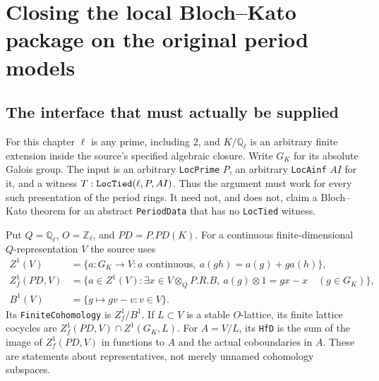 \section{Closing the local Bloch--Kato package on the original period models}
\label{sec:bloch-kato-installation}


\subsection{The interface that must actually be supplied}

For this chapter $\ell$ is any prime, including $2$, and
$K/\mathbb Q_\ell$ is an arbitrary finite extension inside the source's
specified algebraic closure.  Write $G_K$ for its absolute Galois group.
The input is an arbitrary \texttt{Loc\allowbreak Prime} $P$, an arbitrary
\texttt{Loc\allowbreak Ainf} $AI$ for it, and a witness
$T:\texttt{Loc\allowbreak Tied}(\ell,P,AI)$.  Thus the argument must work for every
such presentation of the period rings.  It need not, and does not,
claim a Bloch--Kato theorem for an abstract \texttt{Period\allowbreak Data} that has
no \texttt{Loc\allowbreak Tied} witness.

Put $Q=\mathbb Q_\ell$, $O=\mathbb Z_\ell$, and $PD=P.PD(K)$.
For a continuous finite-dimensional $Q$-representation $V$ the
source uses
\[
 \begin{split}
 Z^1(V)&=\{a:G_K\longrightarrow V:
     a\text{ continuous},\
     a(gh)=a(g)+g a(h)\},\\
 Z_f^1(PD,V)&=\{a\in Z^1(V):
     \exists x\in V\otimes_Q P.R.B,\
     a(g)\otimes1=gx-x\quad(g\in G_K)\},\\
 B^1(V)&=\{g\longmapsto gv-v:v\in V\}.
 \end{split}                                                   \tag{BX.1}
\]
Its \texttt{Finite\allowbreak Cohomology} is $Z_f^1/B^1$.  If $L\subset V$ is a
stable $O$-lattice, its finite lattice cocycles are
$Z_f^1(PD,V)\cap Z^1(G_K,L)$.  For $A=V/L$, its \texttt{Hf\allowbreak D} is the
sum of the image of $Z_f^1(PD,V)$ in functions to $A$ and the actual
coboundaries in $A$.  These are statements about representatives,
not merely unnamed cohomology subspaces.

